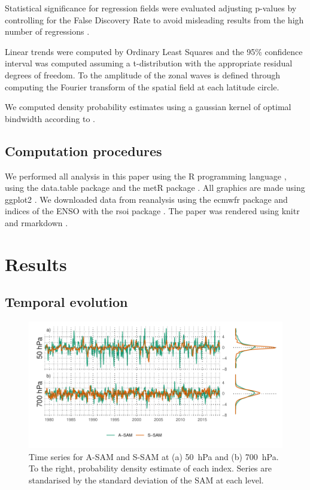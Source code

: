 \documentclass[smallextended]{svjour3}       %
\begin{document}
Statistical significance for regression fields were evaluated adjusting p-values by controlling for the False Discovery Rate \citep{benjamini1995, wilks2016} to avoid misleading results from the high number of regressions \citep{walker1914, katz1991}.

Linear trends were computed by Ordinary Least Squares and the 95\% confidence interval was computed assuming a t-distribution with the appropriate residual degrees of freedom. To the amplitude of the zonal waves is defined through computing the Fourier transform of the spatial field at each latitude circle.

We computed density probability estimates using a gaussian kernel of optimal bindwidth according to \citet{sheather1991}.

\hypertarget{computation-procedures}{%
\subsection{Computation procedures}\label{computation-procedures}}

We performed all analysis in this paper using the R programming language \citep{rcoreteam2020}, using the data.table package \citep{dowle2020} and the metR package \citep{campitelli2020}. All graphics are made using ggplot2 \citep{wickham2009}. We downloaded data from reanalysis using the ecmwfr package \citep{hufkens2020} and indices of the ENSO with the rsoi package \citep{albers2020}. The paper was rendered using knitr and rmarkdown \citep{xie2015, allaire2019}.

\hypertarget{results}{%
\section{Results}\label{results}}

\hypertarget{temporal}{%
\subsection{Temporal evolution}\label{temporal}}

\begin{figure}
\includegraphics{asymsam-timeseries-1} \caption{Time series for A\nobreakdash-SAM and S\nobreakdash-SAM at (a) 50~hPa and (b) 700~hPa. To the right, probability density estimate of each index. Series are standarised by the standard deviation of the SAM at each level.}\label{fig:asymsam-timeseries}
\end{figure}
\end{document}
